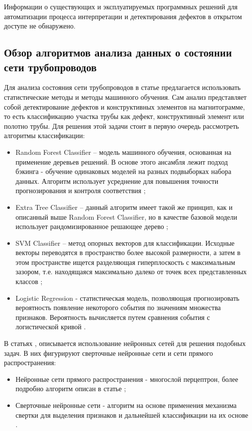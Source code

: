 \documentclass[a4paper,article,14pt]{extarticle}
\begin{document}
Информации о существующих и эксплуатируемых программных решений для автоматизации процесса интерпретации и детектирования дефектов в открытом доступе не обнаружено.

\subsection{Обзор алгоритмов анализа данных о состоянии сети трубопроводов}

Для анализа состояния сети трубопроводов в статье \cite{a2} предлагается использовать 
статистические методы и методы машинного обучения. Сам анализ представляет собой детектирование дефектов и 
конструктивных элементов на магнитограмме, то есть классификацию участка трубы как дефект, конструктивный 
элемент или полотно трубы. Для решения этой задачи стоит в первую очередь рассмотреть алгоритмы классификации:

\begin{itemize}
    \item Random Forest Classifier – модель машинного обучения, основанная на применение деревьев решений. В основе этого ансамбля лежит подход бэкинга - обучение одинаковых моделей на разных подвыборках набора данных. Алгоритм использует усреднение для повышения точности прогнозирования и контроля соответствия \cite{a3};
    \item Extra Tree Classifier – данный алгоритм имеет такой же принцип, как и описанный выше Random Forest Classifier, но в качестве базовой модели использует рандомизированное решающее дерево \cite{a4};
    \item SVM Classifier – метод опорных векторов для классификации. Исходные векторы переводятся в пространство более высокой размерности, а затем в этом пространстве ищется разделяющая гиперплоскость с максимальным зазором, т.е. находящаяся максимально далеко от точек всех представленных классов \cite{a5};
    \item Logistic Regression - статистическая модель, позволяющая прогнозировать вероятность появление некоторого события по значениям множества признаков. Вероятность вычисляется путем сравнения события с логистической кривой \cite{a6}.
\end{itemize}

В статьях  \cite{a7}, \cite{a8} описывается использование нейронных сетей для решения подобных задач. В них фигурируют сверточные нейронные сети и сети прямого распространения:

\begin{itemize}
    \item Нейронные сети прямого распространения - многослой перцептрон, более подробно алгоритм описан в статье \cite{a9};
    \item Сверточные нейронные сети - алгоритм на основе применения механизма свертки для выделения
    признаков и дальнейшей классификации на их основе \cite{a10}.
\end{itemize}
\end{document}

